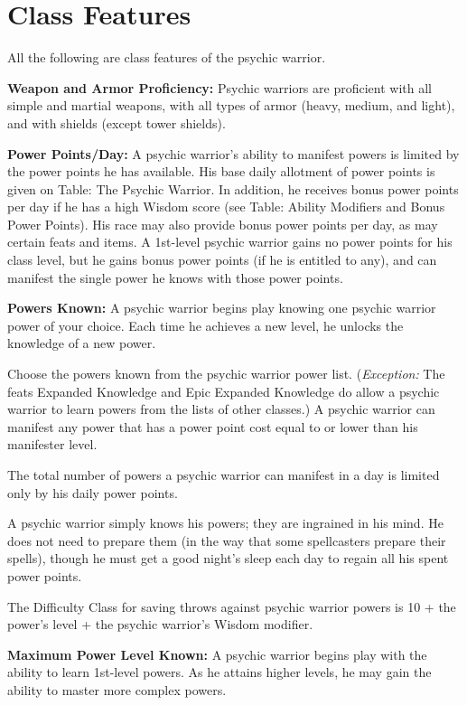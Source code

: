 \documentclass{article}
\begin{document}
\section*{\textbf{Class Features}}

All the following are class features of the psychic warrior.

\textbf{Weapon and Armor Proficiency:} Psychic warriors are proficient with all 
simple and martial weapons, with all types of armor (heavy, medium, and light), 
and with shields (except tower shields).

\textbf{Power Points/Day: }A psychic warrior's ability to manifest powers is limited 
by the power points he has available. His base daily allotment of power points 
is given on Table: The Psychic Warrior. In addition, he receives bonus power points 
per day if he has a high Wisdom score (see Table: Ability Modifiers and Bonus Power 
Points). His race may also provide bonus power points per day, as may certain feats 
and items. A 1st-level psychic warrior gains no power points for his class level, 
but he gains bonus power points (if he is entitled to any), and can manifest the 
single power he knows with those power points.

\textbf{Powers Known: }A psychic warrior begins play knowing one psychic warrior 
power of your choice. Each time he achieves a new level, he unlocks the knowledge 
of a new power.

Choose the powers known from the psychic warrior power list. (\textit{Exception: 
}The feats Expanded Knowledge and Epic Expanded Knowledge do allow a psychic warrior 
to learn powers from the lists of other classes.) A psychic warrior can manifest 
any power that has a power point cost equal to or lower than his manifester level.

The total number of powers a psychic warrior can manifest in a day is limited only 
by his daily power points.

A psychic warrior simply knows his powers; they are ingrained in his mind. He does 
not need to prepare them (in the way that some spellcasters prepare their spells), 
though he must get a good night's sleep each day to regain all his spent power 
points.

The Difficulty Class for saving throws against psychic warrior powers is 10 + the 
power's level + the psychic warrior's Wisdom modifier.

\textbf{Maximum Power Level Known:} A psychic warrior begins play with the ability 
to learn 1st-level powers. As he attains higher levels, he may gain the ability 
to master more complex powers.
\end{document}
